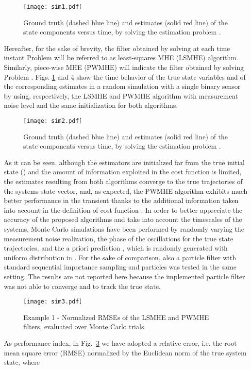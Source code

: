 \documentclass[11pt,journal,onecolumn]{IEEEtran}
\begin{document}
\begin{figure}[h!]
\centering
\texttt{[image: sim1.pdf]}
\caption{Ground truth (dashed blue line) and estimates (solid red line) of the state components versus time, by solving the estimation problem .}
\label{fig:sim1}
\end{figure}
Hereafter, for the sake of brevity, the filter obtained by solving at each time instant Problem  will be referred to as least-squares MHE (LSMHE) algorithm. Similarly, piece-wise MHE (PWMHE) will indicate the filter obtained by solving Problem . Figs. \ref{fig:sim1} and 4 show the time behavior of the true state variables and of the corresponding estimates in a random simulation with a single binary sensor
by using, respectively, the LSMHE and PWMHE algorithm with measurement noise level  and the same initialization for both algorithms.
\begin{figure}[h!]
\centering
\texttt{[image: sim2.pdf]}
\caption{Ground truth (dashed blue line) and estimates (solid red line) of the state components versus time, by solving the estimation problem .}
\label{fig:sim2}
\end{figure}
As it can be seen, although the estimators are initialized far from the true initial state () and the amount of information exploited in the cost function is limited, the estimates resulting from both algorithms converge to the true trajectories of the systems state vector, and, as  expected, the PWMHE algorithm exhibits much better performance in the transient  thanks to the additional information taken into account in the definition of cost function . In order to better appreciate the accuracy of the proposed algorithms and take into account the timescales of the systems, Monte Carlo simulations have been performed by randomly varying the measurement noise realization, the phase of the oscillations for the true state trajectories, and the a priori prediction , which is randomly generated with uniform distribution in . For the sake of comparison, also a particle filter with standard sequential importance sampling and  particles was tested in the same setting. The results are not reported here because the implemented particle filter was not able to converge and to track the true state.
\begin{figure}[h!]
\centering
\texttt{[image: sim3.pdf]}
\caption{Example 1 - Normalized RMSEs of the LSMHE and PWMHE filters, evaluated over  Monte Carlo trials.}
\label{fig:RMSE}
\end{figure}
As performance index, in Fig.~\ref{fig:RMSE} we have adopted a relative error, i.e. the root mean square error (RMSE) normalized by the Euclidean norm of the true system state, where
\end{document}
